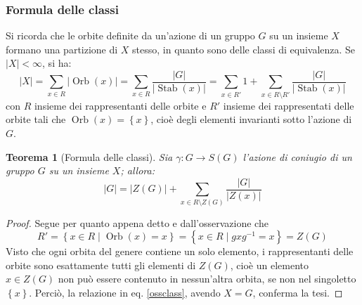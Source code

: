 \documentclass[12pt]{scrartcl}
\theoremstyle{style}
\newtheorem{teorema}{Teorema}[section]
\numberwithin{equation}{subsection}
\begin{document}
\subsubsection{Formula delle classi}

Si ricorda che le orbite definite da un'azione di un gruppo $G$ su un insieme $X$ formano una partizione di $X$ stesso, in quanto sono delle classi di equivalenza.
Se $\lvert X \rvert < \infty$, si ha:
\begin{equation}\label{ossclass}
\lvert X \rvert  = \sum_{x \in R}^{} \lvert \operatorname{Orb} (x) \rvert = \sum_{x \in R}^{} \frac{\lvert G \rvert }{\lvert \operatorname{Stab} (x) \rvert } = \sum_{x \in R'}^{} 1 + \sum_{x \in R \setminus R '}^{} \frac{\lvert G \rvert }{\lvert \operatorname{Stab} (x) \rvert }
\end{equation}
con $R$ insieme dei rappresentanti delle orbite e $R'$ insieme dei rappresentati delle orbite tali che $\operatorname{Orb} (x) = \left\{ x \right\} $, cio\`e degli elementi invarianti sotto l'azione di $G$. 
\begin{teorema}
	[Formula delle classi]
	Sia $\gamma:G \to S(G)$ l'azione di coniugio di un gruppo $G$ su un insieme $X$; allora:
	\begin{equation*}
		\lvert G \rvert  = |Z(G)| + \sum_{x \in R \setminus Z(G)}^{} \frac{\lvert G \rvert }{\lvert Z(x) \rvert }
	\end{equation*}
\end{teorema}
	\begin{proof}
		Segue per quanto appena detto e dall'osservazione che
		\[
		R' = \left\{ x \in R  \mid \operatorname{Orb} (x) = x \right\} = \left\{ x \in R  \mid gxg^{-1} = x \right\} = Z(G)
		\] 
		Visto che ogni orbita del genere contiene un solo elemento, i rappresentanti delle orbite sono esattamente tutti gli elementi di $Z(G)$, cio\`e un elemento $x \in Z(G)$ non pu\`o essere contenuto in nessun'altra orbita, se non nel singoletto $\left\{ x \right\} $.
		Perci\`o, la relazione in eq. \ref{ossclass}, avendo $X=G$, conferma la tesi.
	\end{proof}
\end{document}
